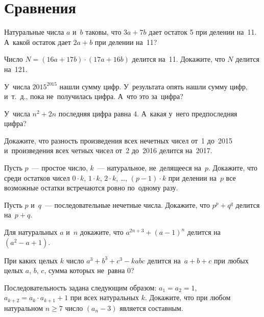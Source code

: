 
\section*{Сравнения}


\begin{problems}

\item
Натуральные числа $a$ и~$b$ таковы, что $3 a + 7 b$ дает остаток 5 при делении
на~11.
А~какой остаток дает $2 a + b$ при делении на~11?

\item
Число $N = (16 a + 17 b) \cdot(17 a + 16 b)$ делится на~11.
Докажите, что $N$ делится на~121.

\item
У~числа $2015^{2015}$ нашли сумму цифр.
У~результата опять нашли сумму цифр, и~т.~д., пока не~получилась цифра.
А~что это за~цифра?

\item
У~числа $n^2 + 2 n$ последняя цифра равна 4.
А~какая у~него предпоследняя цифра?

\item
Докажите, что разность произведения всех нечетных чисел от~1 до~2015
и~произведения всех четных чисел от~2 до~2016 делится на~2017.

\item
Пусть $p$~--- простое число, $k$~--- натуральное, не~делящееся на~$p$.
Докажите, что среди остатков чисел
$0 \cdot k$, $1 \cdot k$, $2 \cdot k$, \ldots, $(p - 1) \cdot k$ при делении
на~$p$ все возможные остатки встречаются ровно по~одному разу. 

\item
Пусть $p$ и~$q$~--- последовательные нечетные числа.
Докажите, что $p^p + q^q$ делится на~$p + q$. 

\item
Для натуральных $a$ и~$n$ докажите, что
$a^{2n+3} + (a - 1)^n$ делится на~$(a^2 - a + 1)$.


\item
При каких целых $k$ число $a^3 + b^3 + c^3 - k a b c$ делится на~$a + b + c$
при любых целых $a$, $b$, $c$, сумма которых не~равна 0?


\item
Последовательность задана следующим образом: $a_1 = a_2 = 1$,
$a_{k+2} = a_k \cdot a_{k+1} + 1$ при всех натуральных $k$.
Докажите, что при любом натуральном $n \geq 7$ число $(a_n - 3)$ является
составным.

\end{problems}

